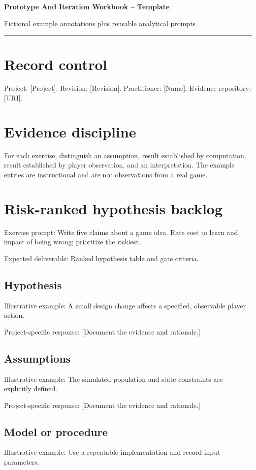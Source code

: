 \documentclass[11pt]{article}
\begin{document}
{\huge\bfseries\color{suiteblue} Prototype And Iteration Workbook -- Template}\par
\vspace{0.15in}
{\normalsize\color{suitegray} Fictional example annotations plus reusable analytical prompts}\par
\vspace{0.15in}\hrule\vspace{0.15in}

\section{Record control}
Project: [Project]. Revision: [Revision]. Practitioner: [Name]. Evidence repository: [URI].


\section{Evidence discipline}
For each exercise, distinguish an assumption, result established by computation, result established by player observation, and an interpretation. The example entries are instructional and are not observations from a real game.


\section{Risk-ranked hypothesis backlog}
Exercise prompt: Write five claims about a game idea. Rate cost to learn and impact of being wrong; prioritize the riskiest.

Expected deliverable: Ranked hypothesis table and gate criteria.


\subsection{Hypothesis}
Illustrative example: A small design change affects a specified, observable player action.

Project-specific response: [Document the evidence and rationale.]


\subsection{Assumptions}
Illustrative example: The simulated population and state constraints are explicitly defined.

Project-specific response: [Document the evidence and rationale.]


\subsection{Model or procedure}
Illustrative example: Use a repeatable implementation and record input parameters.
\end{document}

